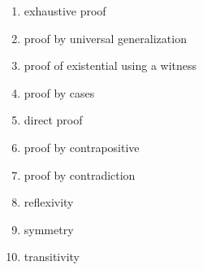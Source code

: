 \begin{multicols}{2}
\begin{enumerate}[label=\roman*]
\item exhaustive proof
\item proof by universal generalization
\item proof of existential using a witness
\item proof by cases
\item direct proof
\item proof by contrapositive
\item proof by contradiction
\item reflexivity
\item symmetry
\item transitivity
\end{enumerate}
\end{multicols}